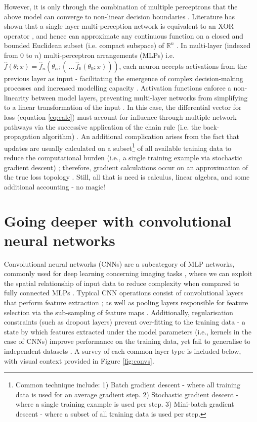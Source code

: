 However, it is only through the combination of multiple perceptrons that the
above model can converge to non-linear decision boundaries \cite{Maier2019}.
Literature has shown that a single layer multi-perception network is equivalent
to an XOR operator \cite{Yanling}, and hence can approximate any continuous
function on a closed and bounded Euclidean subset (i.e. compact subspace) of
$\mathbb{R}^{n}$ \cite{Cybenko1989}. In multi-layer (indexed from $0$ to $n$)
multi-perceptron arrangements (MLPs) i.e. $\hat{f}(\theta; x)=
\hat{f}_{n}(\theta_{n};(\,... \,\hat{f}_{0}(\theta_{0}; x)))$, each neuron
accepts activations from the previous layer as input - facilitating the
emergence of complex decision-making processes and increased modelling capacity
\cite{Maier2019}. Activation functions enforce a non-linearity between model
layers, preventing multi-layer networks from simplifying to a linear
transformation of the input \cite{Aggarwal2018}. In this case, the differential
vector for loss (equation \ref{eq:calc}) must account for influence through
multiple network pathways via the successive application of the chain rule (i.e.
the back-propagation algorithm) \cite{Maier2019}. An additional complication
arises from the fact that updates are usually calculated on a
subset\footnote{Common technique include: 1) Batch gradient descent - where all
training data is used for an average gradient step. 2) Stochastic gradient
descent - where a single training example is used per step. 3) Mini-batch
gradient descent - where a subset of all training data is used per step.} of all
available training data to reduce the computational burden (i.e., a single
training example via stochastic gradient descent) \cite{Sun2019}; therefore,
gradient calculations occur on an approximation of the true loss topology
\cite{Sun2019}. Still, all that is need is calculus, linear algebra, and some
additional accounting - no magic!


\section{Going deeper with convolutional neural networks}
Convolutional neural networks (CNNs) are a subcategory of MLP networks, commonly
used for deep learning concerning imaging tasks \cite{Maier2019}, where we can
exploit the spatial relationship of input data to reduce complexity when
compared to fully connected MLPs \cite{Lundervold2019}. Typical CNN operations
consist of convolutional layers that perform feature extraction
\cite{Hesamian2019}; as well as pooling layers responsible for feature selection
via the sub-sampling of feature maps \cite{Ronneberger_2015}. Additionally,
regularisation constraints (such as dropout layers) prevent over-fitting to the
training data - a state by which features extracted under the model parameters
(i.e., kernels in the case of CNNs) improve performance on the training data, yet
fail to generalise to independent datasets \cite{Lundervold2019}. A survey of
each common layer type is included below, with visual context provided in Figure
\ref{fig:convs}.

